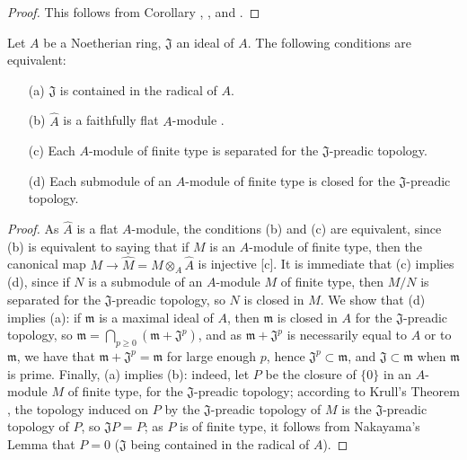 \begin{proof}
\label{proof-0.7.3.4}
This follows from Corollary , , and .
\end{proof}

\begin{corollary}[7.3.5]
\label{0.7.3.5}
Let $A$ be a Noetherian ring, $\mathfrak{J}$ an ideal of $A$. The following conditions are
equivalent:
\begin{enumerate}
  \item[{\rm(a)}] $\mathfrak{J}$ is contained in the radical of $A$.
  \item[{\rm(b)}] $\widehat{A}$ is a faithfully flat $A$-module .
  \item[{\rm(c)}] Each $A$-module of finite type is separated for the $\mathfrak{J}$-preadic topology.
  \item[{\rm(d)}] Each submodule of an $A$-module of finite type is closed for the $\mathfrak{J}$-preadic topology.
\end{enumerate}
\end{corollary}

\begin{proof}
\label{proof-0.7.3.5}
As $\widehat{A}$ is a flat $A$-module, the conditions (b) and (c) are equivalent, since
(b) is equivalent to saying that if $M$ is an $A$-module of finite type, then the canonical
map $M\to\widehat{M}=M\otimes_A\widehat{A}$ is injective [c].
It is immediate that (c) implies (d), since if $N$ is a submodule of an $A$-module $M$ of
finite type, then $M/N$ is separated for the $\mathfrak{J}$-preadic topology, so $N$ is
closed in $M$. We show that (d) implies (a): if $\mathfrak{m}$ is a maximal ideal of $A$,
then $\mathfrak{m}$ is closed in $A$ for the $\mathfrak{J}$-preadic topology, so
$\mathfrak{m}=\bigcap_{p\geq 0}(\mathfrak{m}+\mathfrak{J}^p)$, and as
$\mathfrak{m}+\mathfrak{J}^p$ is necessarily equal to $A$ or to $\mathfrak{m}$, we have that
$\mathfrak{m}+\mathfrak{J}^p=\mathfrak{m}$ for large enough $p$,
hence $\mathfrak{J}^p\subset\mathfrak{m}$, and $\mathfrak{J}\subset\mathfrak{m}$ when
$\mathfrak{m}$ is prime. Finally, (a) implies (b): indeed, let $P$ be the closure of $\{0\}$
in an $A$-module $M$ of finite type, for the $\mathfrak{J}$-preadic topology; according to
Krull's Theorem , the topology induced on $P$ by the
$\mathfrak{J}$-preadic topology of $M$ is the $\mathfrak{J}$-preadic topology of $P$,
so $\mathfrak{J}P=P$; as $P$ is of finite type, it follows from Nakayama's Lemma that
$P=0$ ($\mathfrak{J}$ being contained in the radical of $A$).
\end{proof}

